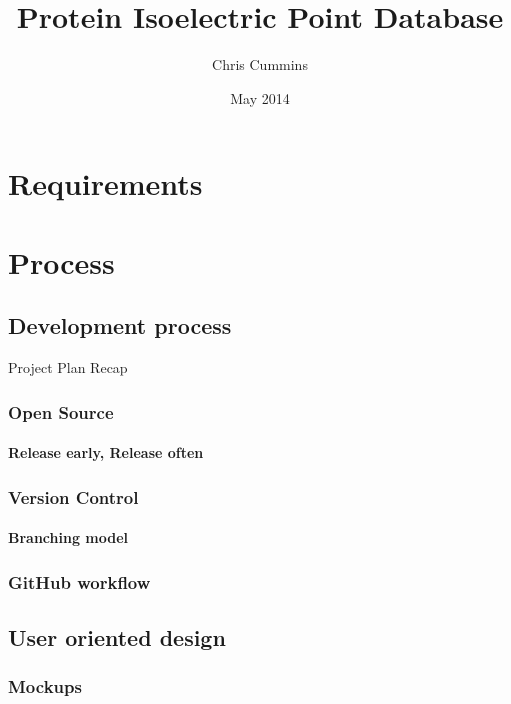 \documentclass[12pt]{report}
\title{Protein Isoelectric Point Database}
\author{Chris Cummins}
\date{May 2014}
\begin{document}




\tableofcontents
\listoffigures
\listoftables

\newpage




\chapter{Requirements}

\lipsum[10-20]

\chapter{Process}

\section{Development process}
Project Plan Recap

\subsection{Open Source}
\subsubsection{Release early, Release often}

\subsection{Version Control}
\subsubsection{Branching model}

\subsection{GitHub workflow}

\section{User oriented design}
\subsection{Mockups}
\end{document}
